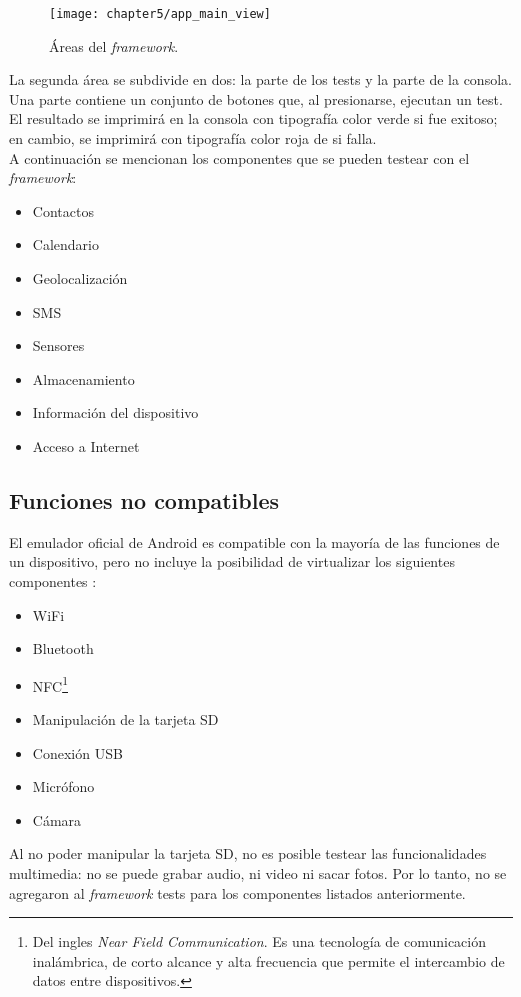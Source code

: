 \begin{figure}[hbtp]
    \centering
	\texttt{[image: chapter5/app\_main\_view]}
	\caption{Áreas del \textit{framework}.}
	\label{fig:chapter05:main_view}
\end{figure}
La segunda área se subdivide en dos: la parte de los tests y la parte de la consola. Una parte contiene un conjunto de botones que, al presionarse, ejecutan un test. El resultado se imprimirá en la consola con tipografía color verde si fue exitoso; en cambio, se imprimirá con tipografía color roja de si falla.\\

A continuación se mencionan los componentes que se pueden testear con el \textit{framework}:
\begin{itemize}
	\item Contactos
	\item Calendario
	\item Geolocalización
	\item SMS
	\item Sensores
	\item Almacenamiento
	\item Información del dispositivo
	\item Acceso a Internet
\end{itemize}
\subsection{Funciones no compatibles}
El emulador oficial de Android es compatible con la mayoría de las funciones de un dispositivo, pero no incluye la posibilidad de virtualizar los siguientes componentes \cite{daemu}:
\begin{itemize}
    \item WiFi
    \item Bluetooth
    \item NFC\footnote{Del ingles \emph{Near Field Communication}. Es una tecnología de comunicación inalámbrica, de corto alcance y alta frecuencia que permite el intercambio de datos entre dispositivos.}
    \item Manipulación de la tarjeta SD
    \item Conexión USB
    \item Micrófono
    \item Cámara
\end{itemize}
Al no poder manipular la tarjeta SD, no es posible testear las funcionalidades multimedia: no se puede grabar audio, ni video ni sacar fotos. Por lo tanto, no se agregaron al \textit{framework} tests para los componentes listados anteriormente.
